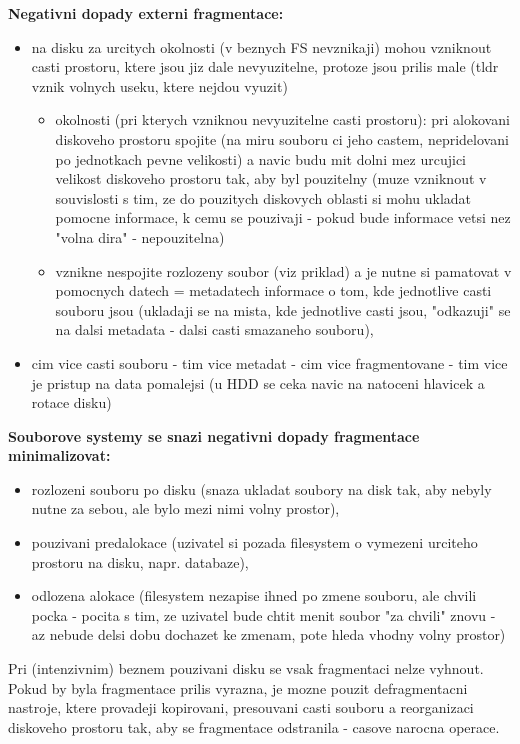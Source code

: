 \documentclass[a4paper, 11pt]{article}
\begin{document}
\noindent\textbf{Negativni dopady externi fragmentace:}
\begin{itemize}
    \item na disku za urcitych okolnosti (v beznych FS nevznikaji) mohou vzniknout casti prostoru, ktere jsou jiz dale nevyuzitelne, protoze jsou prilis male (tldr vznik volnych useku, ktere nejdou vyuzit)
    \begin{itemize}
        \item okolnosti (pri kterych vzniknou nevyuzitelne casti prostoru): pri alokovani diskoveho prostoru spojite (na miru souboru ci jeho castem, nepridelovani po jednotkach pevne velikosti) a navic budu mit dolni mez urcujici velikost diskoveho prostoru tak, aby byl pouzitelny (muze vzniknout v souvislosti s tim, ze do pouzitych diskovych oblasti si mohu ukladat pomocne informace, k cemu se pouzivaji - pokud bude informace vetsi nez "volna dira" - nepouzitelna)
        \item vznikne nespojite rozlozeny soubor (viz priklad) a je nutne si pamatovat v pomocnych datech = metadatech informace o tom, kde jednotlive casti souboru jsou (ukladaji se na mista, kde jednotlive casti jsou, "odkazuji" se na dalsi metadata - dalsi casti smazaneho souboru),
    \end{itemize}
    \item cim vice casti souboru - tim vice metadat - cim vice fragmentovane - tim vice je pristup na data pomalejsi (u HDD se ceka navic na natoceni hlavicek a rotace disku) \\
\end{itemize}

\noindent\textbf{Souborove systemy se snazi negativni dopady fragmentace minimalizovat:}
\begin{itemize}
    \item rozlozeni souboru po disku (snaza ukladat soubory na disk tak, aby nebyly nutne za sebou, ale bylo mezi nimi volny prostor),
    \item pouzivani predalokace (uzivatel si pozada filesystem o vymezeni urciteho prostoru na disku, napr. databaze),
    \item odlozena alokace (filesystem nezapise ihned po zmene souboru, ale chvili pocka - pocita s tim, ze uzivatel bude chtit menit soubor "za chvili" znovu - az nebude delsi dobu dochazet ke zmenam, pote hleda vhodny volny prostor) \\
\end{itemize}

\noindent Pri (intenzivnim) beznem pouzivani disku se vsak fragmentaci nelze vyhnout. Pokud by byla fragmentace prilis vyrazna, je mozne pouzit defragmentacni nastroje, ktere provadeji kopirovani, presouvani casti souboru a reorganizaci diskoveho prostoru tak, aby se fragmentace odstranila - casove narocna operace. \\
\end{document}
